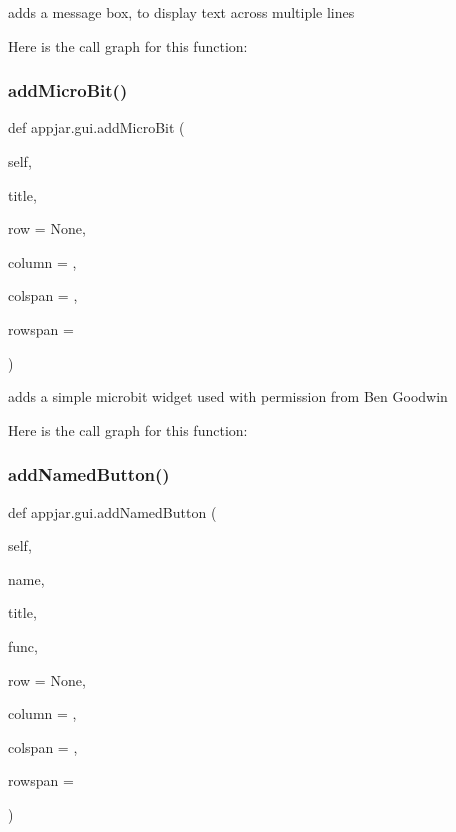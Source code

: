 \begin{DoxyVerb}adds a message box, to display text across multiple lines \end{DoxyVerb}
 Here is the call graph for this function\+:
\mbox{\label{classappjar_1_1gui_a240e0115334d1c35bfe1893b421ea9c5}} 
\subsubsection{\texorpdfstring{add\+Micro\+Bit()}{addMicroBit()}}
{\footnotesize\ttfamily def appjar.\+gui.\+add\+Micro\+Bit (\begin{DoxyParamCaption}\item[{}]{self,  }\item[{}]{title,  }\item[{}]{row = {\ttfamily None},  }\item[{}]{column = {},  }\item[{}]{colspan = {},  }\item[{}]{rowspan = {} }\end{DoxyParamCaption})}

\begin{DoxyVerb}adds a simple microbit widget
     used with permission from Ben Goodwin \end{DoxyVerb}
 Here is the call graph for this function\+:
\mbox{\label{classappjar_1_1gui_ab475964a93056bdc3de972f3fe3728b6}} 
\subsubsection{\texorpdfstring{add\+Named\+Button()}{addNamedButton()}}
{\footnotesize\ttfamily def appjar.\+gui.\+add\+Named\+Button (\begin{DoxyParamCaption}\item[{}]{self,  }\item[{}]{name,  }\item[{}]{title,  }\item[{}]{func,  }\item[{}]{row = {\ttfamily None},  }\item[{}]{column = {},  }\item[{}]{colspan = {},  }\item[{}]{rowspan = {} }\end{DoxyParamCaption})}

